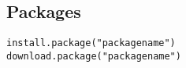 \subsection{Packages}

\begin{verbatim}
install.package("packagename")
download.package("packagename")
\end{verbatim}

